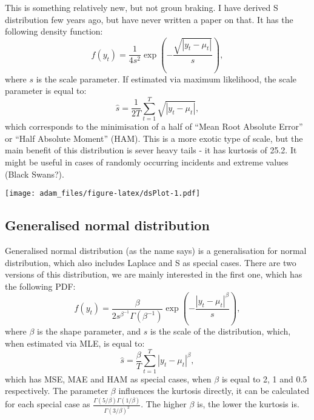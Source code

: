\documentclass[]{book}
\begin{document}
This is something relatively new, but not groun braking. I have derived S distribution few years ago, but have never written a paper on that. It has the following density function:
\begin{equation} \label{eq:S}
    f(y_t) = \frac{1}{4 s^2} \exp \left( -\frac{\sqrt{|y_t - \mu_t|}}{s} \right) ,
\end{equation}
where \(s\) is the scale parameter. If estimated via maximum likelihood, the scale parameter is equal to:
\begin{equation} \label{eq:sS}
    \hat{s} = \frac{1}{2T} \sum_{t=1}^T \sqrt{\left| y_t - \mu_t \right|} ,
\end{equation}
which corresponds to the minimisation of a half of ``Mean Root Absolute Error'' or ``Half Absolute Moment'' (HAM). This is a more exotic type of scale, but the main benefit of this distribution is sever heavy tails - it has kurtosis of 25.2. It might be useful in cases of randomly occurring incidents and extreme values (Black Swans?).

\texttt{[image: adam\_files/figure-latex/dsPlot-1.pdf]}

\hypertarget{generalised-normal-distribution}{%
\subsection{Generalised normal distribution}\label{generalised-normal-distribution}}

Generalised normal distribution (as the name says) is a generalisation for normal distribution, which also includes Laplace and S as special cases. There are two versions of this distribution, we are mainly interested in the first one, which has the following PDF:
\begin{equation} \label{eq:GND}
    f(y_t) = \frac{\beta}{2 s^{\beta^{-1}} \Gamma(\beta^{-1})} \exp \left( -\frac{|y_t - \mu_t|^{\beta}}{s} \right),
\end{equation}
where \(\beta\) is the shape parameter, and \(s\) is the scale of the distribution, which, when estimated via MLE, is equal to:
\begin{equation} \label{eq:sGND}
    \hat{s} = \frac{\beta}{T} \sum_{t=1}^T\left| y_t - \mu_t \right|^{\beta} ,
\end{equation}
which has MSE, MAE and HAM as special cases, when \(\beta\) is equal to 2, 1 and 0.5 respectively. The parameter \(\beta\) influences the kurtosis directly, it can be calculated for each special case as \(\frac{\Gamma(5/\beta)\Gamma(1/\beta)}{\Gamma(3/\beta)^2}\). The higher \(\beta\) is, the lower the kurtosis is.
\end{document}
